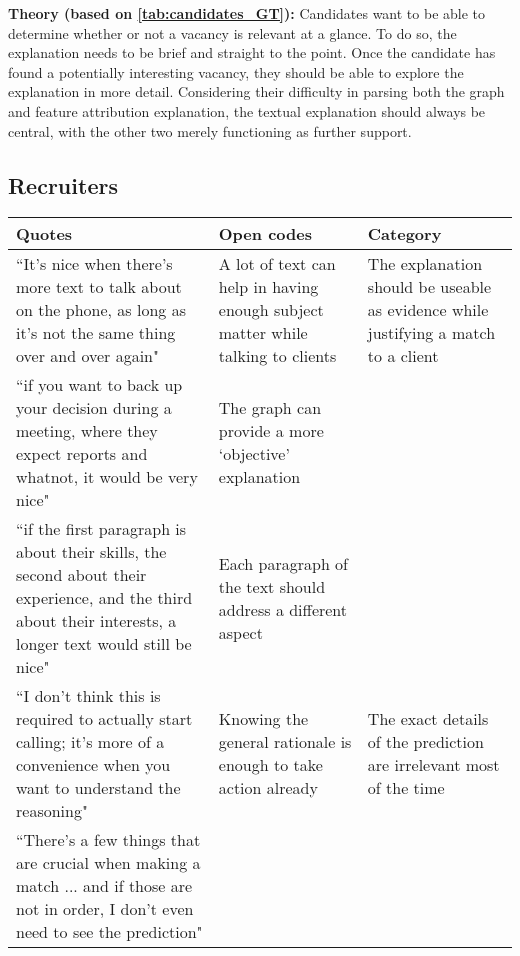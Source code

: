 \noindent \textbf{Theory (based on \cref{tab:candidates_GT}):} Candidates want to be able to determine whether or not a vacancy is relevant at a glance. To do so, the explanation needs to be brief and straight to the point. Once the candidate has found a potentially interesting vacancy, they should be able to explore the explanation in more detail. Considering their difficulty in parsing both the graph and feature attribution explanation, the textual explanation should always be central, with the other two merely functioning as further support. 

\newpage

\subsection{Recruiters}
\begin{table*}[]
\captionsetup{width=1.5\textwidth}
\footnotesize
\begin{adjustwidth}{-2.5in}{-2.5in}
\centering
\begin{tabularx}{1.5\textwidth}{@{}X>{\raggedright\arraybackslash}p{6.5cm}>{\raggedright\arraybackslash}p{3.5cm}@{}}
\toprule
\textbf{Quotes} &
  \textbf{Open codes} &
  \textbf{Category} \\ \midrule
``It's nice when there's more text to talk about on the phone, as long as it's not the same thing over and over again" &
  A lot of text can help in having enough subject matter while talking to clients &
  The explanation should be useable as evidence while justifying a match to a client \\ \cmidrule(r){1-1}
``if you want to back up your decision during a meeting, where they expect reports and whatnot, it would be very nice" &
  The graph can provide a more `objective' explanation &
   \\ \cmidrule(r){1-1}
``if the first paragraph is about their skills, the second about their experience, and the third about their interests, a longer text would still be nice" &
  Each paragraph of the text should address a different aspect &
   \\ \midrule
``I don't think this is required to actually start calling; it's more of a convenience when you want to understand the reasoning" &
  Knowing the general rationale is enough to take action already &
  The exact details of the prediction are irrelevant most of the time \\ \cmidrule(r){1-1}
``There's a few things that are crucial when making a match ... and if those are not in order, I don't even need to see the prediction" &

\end{tabularx}
\end{adjustwidth}
\end{table*}
